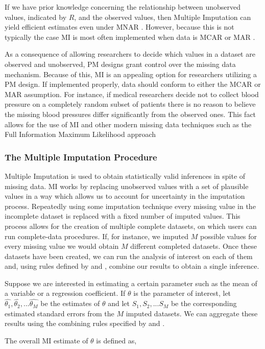 \documentclass{svjour3}                     %
\begin{document}
If we have prior knowledge concerning the relationship between unobserved values, indicated by $R$, and the observed values, then Multiple Imputation can yield efficient estimates even under MNAR \citep{harel2007multiple}. However, because this is not typically the case MI is most often implemented when data is MCAR or MAR \citep{little2014statistical}. \par 
As a consequence of allowing researchers to decide which values in a dataset are observed and unobserved, PM designs grant control over the missing data mechanism. Because of this, MI is an appealing option for researchers utilizing a PM design. If implemented properly, data should conform to either the MCAR or MAR assumption. For instance, if medical researchers decide not to collect blood pressure on a completely random subset of patients there is no reason to believe the missing blood pressures differ significantly from the observed ones. This fact allows for the use of MI and other modern missing data techniques such as the Full Information Maximum Likelihood approach \citep{dempster1977maximum} \par

\subsubsection{The Multiple Imputation Procedure}
\label{sec:1.3.2}
Multiple Imputation is used to obtain statistically valid inferences in spite of missing data. MI works by replacing unobserved values with a set of plausible values in a way which allows us to account for uncertainty in the imputation process. Repeatedly using some imputation technique every missing value in the incomplete dataset is replaced with a fixed number of imputed values. This process allows for the creation of multiple complete datasets, on which users can run complete-data procedures. If, for instance, we imputed $M$ possible values for every missing value we would obtain $M$ different completed datasets. Once these datasets have been created, we can run the analysis of interest on each of them and, using rules defined by \citet{little2014statistical} and \citet{rubin2004multiple}, combine our results to obtain a single inference. \par

Suppose we are interested in estimating a certain parameter such as the mean of a variable or a regression coefficient. If $\theta$ is the parameter of interest, let $\widehat{\theta_1}, \widehat{\theta_2}, ... \widehat{\theta_M}$ be the estimates of $\theta$ and let $S_1, S_2, ... S_M$ be the corresponding estimated standard errors from the $M$ imputed datasets. We can aggregate these results using the combining rules specified by \citet{little2014statistical} and \citet{rubin2004multiple}. \par
The overall MI estimate of $\theta$ is defined as,
\end{document}
